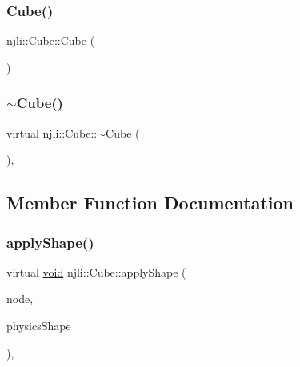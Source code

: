 \subsubsection{\texorpdfstring{Cube()}{Cube()}\hspace{0.1cm}{\footnotesize\ttfamily [3/3]}}
{\footnotesize\ttfamily njli\+::\+Cube\+::\+Cube (\begin{DoxyParamCaption}\item[{const \mbox{\hyperlink{classnjli_1_1_cube}{Cube}} \&}]{ }\end{DoxyParamCaption})\hspace{0.3cm}{\ttfamily [protected]}}

\mbox{\label{classnjli_1_1_cube_a41fff9f47251ee2a39b54866b906200e}} 
\subsubsection{\texorpdfstring{$\sim$\+Cube()}{~Cube()}}
{\footnotesize\ttfamily virtual njli\+::\+Cube\+::$\sim$\+Cube (\begin{DoxyParamCaption}{ }\end{DoxyParamCaption})\hspace{0.3cm}{\ttfamily [protected]}, {\ttfamily [virtual]}}



\subsection{Member Function Documentation}
\mbox{\label{classnjli_1_1_cube_ac3cffa5a972b0925f562fcabab368cd2}} 
\subsubsection{\texorpdfstring{apply\+Shape()}{applyShape()}}
{\footnotesize\ttfamily virtual \mbox{\hyperlink{_thread_8h_af1e856da2e658414cb2456cb6f7ebc66}{void}} njli\+::\+Cube\+::apply\+Shape (\begin{DoxyParamCaption}\item[{\mbox{\hyperlink{classnjli_1_1_node}{Node}} $\ast$}]{node,  }\item[{\mbox{\hyperlink{classnjli_1_1_physics_shape}{Physics\+Shape}} $\ast$}]{physics\+Shape }\end{DoxyParamCaption})\hspace{0.3cm}{\ttfamily [protected]}, {\ttfamily [virtual]}}

